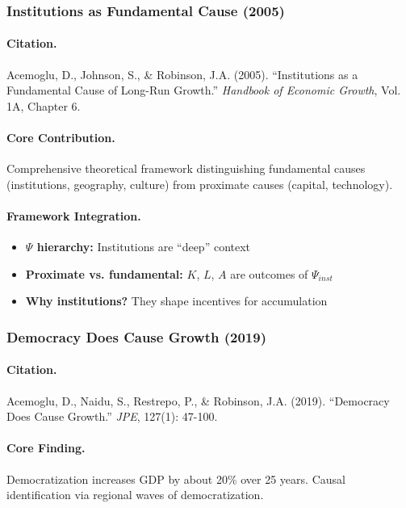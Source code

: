 \subsubsection{Institutions as Fundamental Cause (2005)}

\paragraph{Citation.}
Acemoglu, D., Johnson, S., \& Robinson, J.A. (2005).
``Institutions as a Fundamental Cause of Long-Run Growth.''
\emph{Handbook of Economic Growth}, Vol. 1A, Chapter 6.

\paragraph{Core Contribution.}
Comprehensive theoretical framework distinguishing fundamental causes
(institutions, geography, culture) from proximate causes (capital, technology).

\paragraph{Framework Integration.}
\begin{itemize}
  \item \textbf{$\Psi$ hierarchy:} Institutions are ``deep'' context
  \item \textbf{Proximate vs. fundamental:} $K$, $L$, $A$ are outcomes of $\Psi_{inst}$
  \item \textbf{Why institutions?} They shape incentives for accumulation
\end{itemize}

\subsubsection{Democracy Does Cause Growth (2019)}

\paragraph{Citation.}
Acemoglu, D., Naidu, S., Restrepo, P., \& Robinson, J.A. (2019).
``Democracy Does Cause Growth.'' \emph{JPE}, 127(1): 47-100.

\paragraph{Core Finding.}
Democratization increases GDP by about 20\% over 25 years.
Causal identification via regional waves of democratization.

